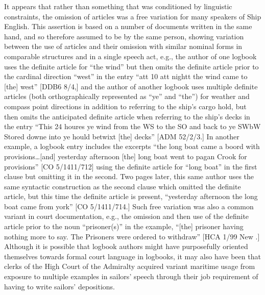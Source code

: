   It appears that rather than something that was conditioned by linguistic constraints, the omission of articles was a free variation for many speakers of Ship English. This assertion is based on a number of documents written in the same hand, and so therefore assumed to be by the same person, showing variation between the use of articles and their omission with similar nominal forms in comparable structures and in a single speech act, e.g., the author of one logbook uses the definite article for “the wind” but then omits the definite article prior to the cardinal direction “west” in the entry “att 10 att nightt the wind came to [the] west” [DDB6 8/4,] and the author of another logbook uses multiple definite articles (both orthographically represented as “ye” and “the”) for weather and compass point directions in addition to referring to the ship’s cargo hold, but then omits the anticipated definite article when referring to the ship’s decks in the entry “This 24 houres ye wind from the WS to the SO and back to ye SWbW Stored downe into ye hould betwixt [the] decks” [ADM 52/2/3.] In another example, a logbook entry includes the excerpts “the long boat came a boord with provisions…[and] yesterday afternoon [the] long boat went to pagan Crook for provisions” [CO 5/1411/712] using the definite article for “long boat” in the first clause but omitting it in the second. Two pages later, this same author uses the same syntactic construction as the second clause which omitted the definite article, but this time the definite article is present, “yesterday afternoon the long boat came from york” [CO 5/1411/714.] Such free variation was also a common variant in court documentation, e.g., the omission and then use of the definite article prior to the noun “prisoner(s)” in the example, “[the] prisoner having nothing more to say. The Prisoners were ordered to withdraw” [HCA 1/99 New \citealt{Providence1722}.] Although it is possible that logbook authors might have purposefully oriented themselves towards formal court language in logbooks, it may also have been that clerks of the High Court of the Admiralty acquired variant maritime usage from exposure to multiple examples in sailors’ speech through their job requirement of having to write sailors’ depositions. 

